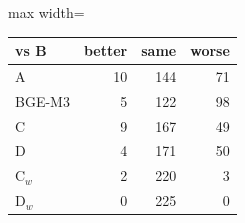 \begin{adjustbox}{max width=\linewidth}
\begin{tabular}{lrrr}
\toprule
vs B & better & same & worse \\
\midrule
A & 10 & 144 & 71 \\
BGE-M3 & 5 & 122 & 98 \\
C & 9 & 167 & 49 \\
D & 4 & 171 & 50 \\
C$_w$ & 2 & 220 & 3 \\
D$_w$ & 0 & 225 & 0 \\
\bottomrule
\end{tabular}
\end{adjustbox}
\par{}
